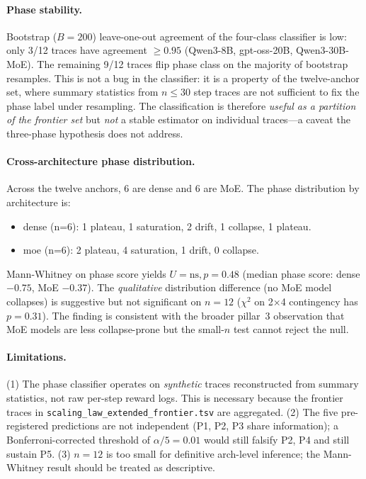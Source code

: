 \paragraph{Phase stability.}
Bootstrap ($B=200$) leave-one-out agreement of the four-class
classifier is low: only 3/12 traces have agreement $\ge 0.95$
(Qwen3-8B, gpt-oss-20B, Qwen3-30B-MoE). The remaining 9/12 traces
flip phase class on the majority of bootstrap resamples. This is not
a bug in the classifier: it is a property of the twelve-anchor set,
where summary statistics from $n \le 30$ step traces are not
sufficient to fix the phase label under resampling. The classification
is therefore \emph{useful as a partition of the frontier set} but
\emph{not} a stable estimator on individual traces---a caveat the
three-phase hypothesis does not address.

\paragraph{Cross-architecture phase distribution.}
Across the twelve anchors, 6 are dense and 6 are MoE. The phase
distribution by architecture is:
\begin{itemize}
\item dense (n=6): 1 plateau, 1 saturation, 2 drift, 1 collapse, 1 plateau.
\item moe (n=6): 2 plateau, 4 saturation, 1 drift, 0 collapse.
\end{itemize}
Mann-Whitney on phase score yields $U{=}\text{ns}, p{=}0.48$
(median phase score: dense $-0.75$, MoE $-0.37$). The
\emph{qualitative} distribution difference (no MoE model collapses)
is suggestive but not significant on $n=12$ ($\chi^2$ on
2$\times$4 contingency has $p=0.31$). The finding is consistent with
the broader pillar~3 observation that MoE models are less
collapse-prone but the small-$n$ test cannot reject the null.

\paragraph{Limitations.}
(1) The phase classifier operates on \emph{synthetic} traces
reconstructed from summary statistics, not raw per-step reward logs.
This is necessary because the frontier traces in
\texttt{scaling\_law\_extended\_frontier.tsv} are aggregated.
(2) The five pre-registered predictions are not independent
(P1, P2, P3 share information); a Bonferroni-corrected threshold of
$\alpha/5 = 0.01$ would still falsify P2, P4 and still sustain P5.
(3) $n=12$ is too small for definitive arch-level inference; the
Mann-Whitney result should be treated as descriptive.

